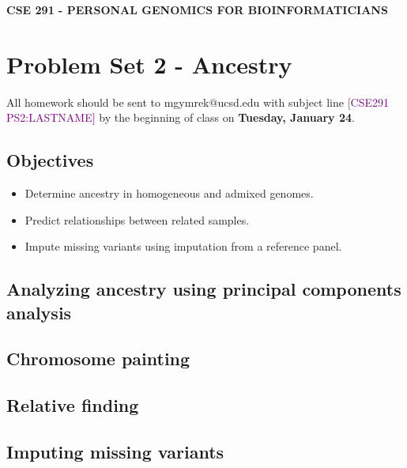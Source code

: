 \documentclass[12pt]{article}
\begin{document}
\textbf{CSE 291 - PERSONAL GENOMICS FOR BIOINFORMATICIANS}

\section*{Problem Set 2 - Ancestry}

All homework should be sent to mgymrek@ucsd.edu with subject line \textcolor{purple}{[CSE291 PS2:LASTNAME]} by the beginning of class on \textbf{Tuesday, January 24}. %

\subsection*{Objectives}
\begin{itemize}
\item Determine ancestry in homogeneous and admixed genomes.
\item Predict relationships between related samples.
\item Impute missing variants using imputation from a reference panel.
\end{itemize}

\subsection*{Analyzing ancestry using principal components analysis}



\subsection*{Chromosome painting}

\subsection*{Relative finding}

\subsection*{Imputing missing variants}
\end{document}
